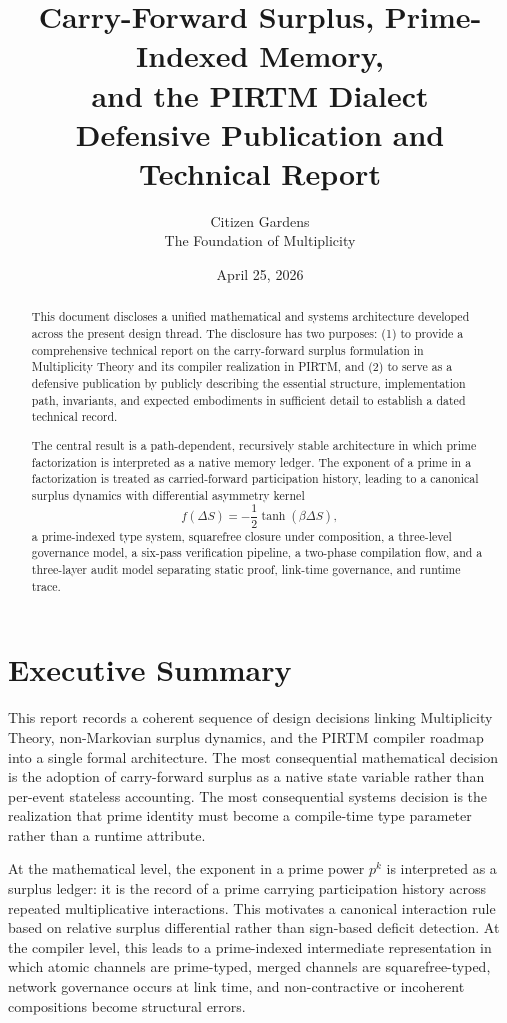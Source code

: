 \documentclass[11pt]{article}
\title{\textbf{Carry-Forward Surplus, Prime-Indexed Memory, \\ and the PIRTM Dialect}\\
\large Defensive Publication and Technical Report}
\author{Citizen Gardens \\ The Foundation of Multiplicity}
\date{April 25, 2026}
\begin{document}
\maketitle
\thispagestyle{fancy}

\begin{abstract}
This document discloses a unified mathematical and systems architecture developed across the present design thread. The disclosure has two purposes: (1) to provide a comprehensive technical report on the carry-forward surplus formulation in Multiplicity Theory and its compiler realization in PIRTM, and (2) to serve as a defensive publication by publicly describing the essential structure, implementation path, invariants, and expected embodiments in sufficient detail to establish a dated technical record.

The central result is a path-dependent, recursively stable architecture in which prime factorization is interpreted as a native memory ledger. The exponent of a prime in a factorization is treated as carried-forward participation history, leading to a canonical surplus dynamics with differential asymmetry kernel
\[
f(\Delta S)=-\frac{1}{2}\tanh(\beta \Delta S),
\]
a prime-indexed type system, squarefree closure under composition, a three-level governance model, a six-pass verification pipeline, a two-phase compilation flow, and a three-layer audit model separating static proof, link-time governance, and runtime trace.
\end{abstract}
\newpage
\tableofcontents\clearpage
\bigskip

\section{Executive Summary}

This report records a coherent sequence of design decisions linking Multiplicity Theory, non-Markovian surplus dynamics, and the PIRTM compiler roadmap into a single formal architecture. The most consequential mathematical decision is the adoption of carry-forward surplus as a native state variable rather than per-event stateless accounting. The most consequential systems decision is the realization that prime identity must become a compile-time type parameter rather than a runtime attribute.

At the mathematical level, the exponent in a prime power \(p^k\) is interpreted as a surplus ledger: it is the record of a prime carrying participation history across repeated multiplicative interactions. This motivates a canonical interaction rule based on relative surplus differential rather than sign-based deficit detection. At the compiler level, this leads to a prime-indexed intermediate representation in which atomic channels are prime-typed, merged channels are squarefree-typed, network governance occurs at link time, and non-contractive or incoherent compositions become structural errors.
\end{document}
